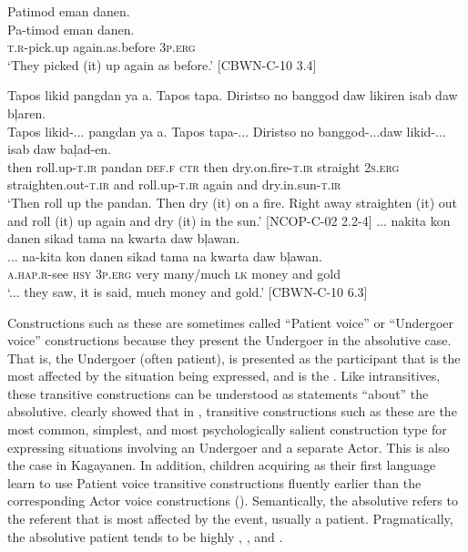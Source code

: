 \ea
Patimod  eman  danen. \\\smallskip
\gll Pa-timod  eman  danen. \\
\textsc{t.r}-pick.up  again.as.before  3\textsc{p.erg} \\
\glt ‘They picked (it) up again as before.’ [CBWN-C-10 3.4]
\z



\ea
Tapos  likid  pangdan  ya  a.  Tapos  tapa. Diristso  no  banggod  daw  likiren  isab  daw  bļaren. \\\smallskip
\gll Tapos  likid-...  pangdan  ya  a.  Tapos  tapa-... Diristso  no  banggod-...\footnotemark  daw  likid-...  isab  daw  baļad-en. \\
then  roll.up-\textsc{t.ir}  pandan  \textsc{def.f}  \textsc{ctr}  then  dry.on.fire-\textsc{t.ir} straight   2\textsc{s.erg}  straighten.out-\textsc{t.ir}  and  roll.up-\textsc{t.ir}  again  and  dry.in.sun-\textsc{t.ir} \\
\glt `Then roll up the pandan. Then dry (it) on a fire. Right away straighten (it) out and roll (it) up again and dry (it) in the sun.’ [NCOP-C-02 2.2-4]
\z
\ea
... nakita  kon  danen sikad  tama  na  kwarta  daw  bļawan. \\\smallskip
\gll ... na-kita  kon  danen sikad  tama  na  kwarta  daw  bļawan. \\
{}  \textsc{a.hap.r}-see  \textsc{hsy}  3\textsc{p.erg} very  many/much  \textsc{lk}  money  and  gold \\
\glt ‘... they saw, it is said, much money and gold.’ [CBWN-C-10 6.3]
\z

Constructions such as these are sometimes called “Patient voice” or “Undergoer voice” constructions because they present the Undergoer in the absolutive case. That is, the Undergoer (often patient), is presented as the participant that is the most affected by the situation being expressed, and is the . Like intransitives, these transitive constructions can be understood as statements “about” the absolutive. \citet{cena1977} clearly showed that in , transitive constructions such as these are the most common, simplest, and most psychologically salient construction type for expressing situations involving an Undergoer and a separate Actor. This is also the case in Kagayanen. In addition, children acquiring  as their first language learn to use Patient voice transitive constructions fluently earlier than the corresponding Actor voice constructions (\citealt{tucker1971, segalowitz1978}). Semantically, the absolutive refers to the referent that is most affected by the event, usually a patient. Pragmatically, the absolutive patient tends to be highly , , and . 


